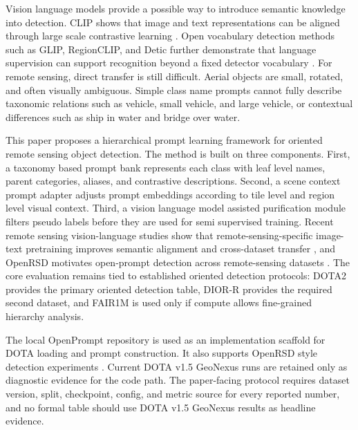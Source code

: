 \documentclass[10pt]{article}
\begin{document}
Vision language models provide a possible way to introduce semantic knowledge into detection. CLIP shows that image and text representations can be aligned through large scale contrastive learning \cite{radford2021clip}. Open vocabulary detection methods such as GLIP, RegionCLIP, and Detic further demonstrate that language supervision can support recognition beyond a fixed detector vocabulary \cite{li2022glip, zhong2022regionclip, zhou2022detic}. For remote sensing, direct transfer is still difficult. Aerial objects are small, rotated, and often visually ambiguous. Simple class name prompts cannot fully describe taxonomic relations such as vehicle, small vehicle, and large vehicle, or contextual differences such as ship in water and bridge over water.

This paper proposes a hierarchical prompt learning framework for oriented remote sensing object detection. The method is built on three components. First, a taxonomy based prompt bank represents each class with leaf level names, parent categories, aliases, and contrastive descriptions. Second, a scene context prompt adapter adjusts prompt embeddings according to tile level and region level visual context. Third, a vision language model assisted purification module filters pseudo labels before they are used for semi supervised training. Recent remote sensing vision-language studies show that remote-sensing-specific image-text pretraining improves semantic alignment and cross-dataset transfer \cite{remoteclip2023, skyscript2023, georsclip2023}, and OpenRSD motivates open-prompt detection across remote-sensing datasets \cite{huang2025openrsd}. The core evaluation remains tied to established oriented detection protocols: DOTA2 provides the primary oriented detection table, DIOR-R provides the required second dataset, and FAIR1M is used only if compute allows fine-grained hierarchy analysis.

The local OpenPrompt repository is used as an implementation scaffold for DOTA loading and prompt construction. It also supports OpenRSD style detection experiments \cite{huang2025openrsd}. Current DOTA v1.5 GeoNexus runs are retained only as diagnostic evidence for the code path. The paper-facing protocol requires dataset version, split, checkpoint, config, and metric source for every reported number, and no formal table should use DOTA v1.5 GeoNexus results as headline evidence.
\end{document}
